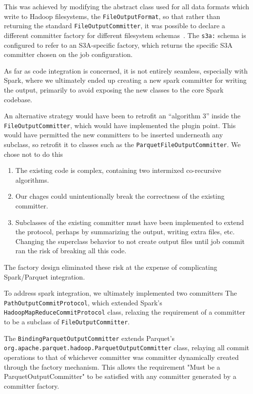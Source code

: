 \documentclass[conference]{IEEEtran}
\begin{document}
This was achieved by modifying the abstract class used for all data formats
which write to Hadoop filesystems, the \texttt{FileOutputFormat}, so that rather than
returning the standard \texttt{FileOutputCommitter}, it was possible to declare
a different committer factory for different filesystem schemas\ \cite{MAPREDUCE-6823}.
The \texttt{s3a:} schema is configured to refer to an S3A-specific factory, which
returns the specific S3A committer chosen on the job configuration.


As far as code integration is concerned, it is not entirely seamless, especially
with Spark, where we ultimately ended up creating a new spark committer for
writing the output, primarily to avoid exposing the new classes to the core
Spark codebase.

An alternative strategy would have been to retrofit an ``algorithm 3'' inside
the \texttt{FileOutputCommitter}, which would have implemented the plugin point.
This would have permitted the new committers to be inserted underneath any
subclass, so retrofit it to classes such as the \texttt{ParquetFileOutputCommitter}.
We chose not to do this

\begin{enumerate}
  \item The existing code is complex, containing two intermixed co-recursive
  algorithms.
  \item Our chages could unintentionally break the correctness of the existing committer.
  \item Subclasses of the existing committer must have been implemented to extend
  the protocol, perhaps by summarizing the output, writing extra files, etc.
  Changing the superclass behavior to not create output files until job commit
  ran the risk of breaking all this code.
\end{enumerate}

The factory design eliminated these risk at the expense of complicating
Spark/Parquet integration.

To address spark integration, we ultimately implemented two committers
The \texttt{PathOutputCommitProtocol}, which extended Spark's
\texttt{HadoopMapReduceCommitProtocol} class, relaxing the requirement of a
committer to be a subclass of \texttt{FileOutputCommitter}.

The \texttt{BindingParquetOutputCommitter} extends Parquet's
\texttt{org.apache.parquet.hadoop.ParquetOutputCommitter} class, relaying
all commit operations to that of whichever committer was committer dynamically created
through the factory mechanism.
This allows the requirement "Must be a ParquetOutputCommitter" to be satisfied
with any committer generated by a committer factory.
\end{document}

